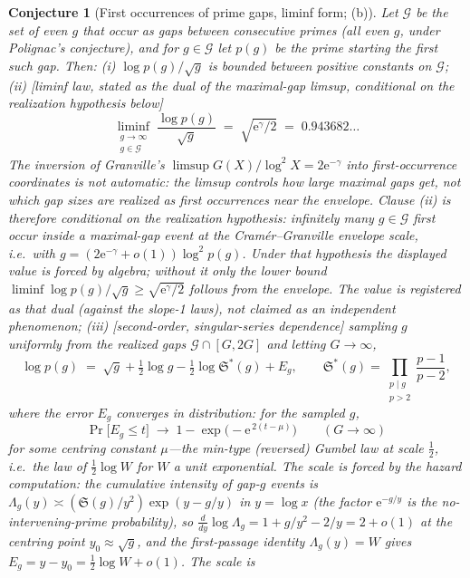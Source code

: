 \documentclass[11pt]{article}
\newtheorem{conjecture}{Conjecture}
\theoremstyle{definition}
\newcommand{\e}{\mathrm{e}}
\newcommand{\SG}{\mathfrak S}
\begin{document}
\setcounter{conjecture}{10}%
\begin{conjecture}[First occurrences of prime gaps, liminf form;
(b)]\label{c19}
Let $\mathcal G$ be the set of even $g$ that occur as gaps between
consecutive primes (all even $g$, under Polignac's conjecture), and for
$g\in\mathcal G$ let $p(g)$ be the prime starting the first such gap.
Then:
\emph{(i)} $\log p(g)/\sqrt g$ is bounded between positive constants
on $\mathcal G$;
\emph{(ii)} [liminf law, stated as the dual of the maximal-gap
limsup, \emph{conditional on the realization hypothesis below}]
\[
\liminf_{\substack{g\to\infty\\ g\in\mathcal G}}
\ \frac{\log p(g)}{\sqrt g}
\;=\;\sqrt{\e^{\gamma}/2}\;=\;0.943682\ldots
\]
The inversion of Granville's $\limsup G(X)/\log^2X=2\e^{-\gamma}$
into first-occurrence coordinates is \emph{not} automatic: the limsup
controls how large maximal gaps get,
not which gap \emph{sizes} are realized as first occurrences near the
envelope.  Clause (ii) is therefore conditional on the
\emph{realization hypothesis}: infinitely many $g\in\mathcal G$ first
occur inside a maximal-gap event at the Cram\'er--Granville envelope
scale, i.e.\ with $g=(2\e^{-\gamma}+o(1))\log^2 p(g)$.  Under that
hypothesis the displayed value is forced by algebra; without it only
the lower bound
$\liminf\log p(g)/\sqrt g\ge\sqrt{\e^{\gamma}/2}$ follows from the
envelope.  The value is registered \emph{as} that dual (against the
slope-1 laws), not claimed as an independent phenomenon;
\emph{(iii)} [second-order, singular-series dependence] sampling $g$
uniformly from the realized gaps $\mathcal G\cap[G,2G]$ and letting
$G\to\infty$,
\[
\log p(g)\;=\;\sqrt g+\tfrac12\log g-\tfrac12\log\SG^{*}(g)+E_g,
\qquad
\SG^{*}(g)=\prod_{\substack{p\mid g\\ p>2}}\frac{p-1}{p-2},
\]
where the error $E_g$ converges in distribution: for the sampled $g$,
\[
\Pr\bigl[E_g\le t\bigr]\;\longrightarrow\;
1-\exp\bigl(-\e^{\,2(t-\mu)}\bigr)
\qquad(G\to\infty)
\]
for some centring constant $\mu$---the min-type (reversed) Gumbel
law \emph{at scale} $\tfrac12$, i.e.\ the law of $\tfrac12\log W$
for $W$ a unit exponential.  The scale is forced by the hazard computation:
the cumulative intensity of
gap-$g$ events is $\Lambda_g(y)\asymp(\SG(g)/y^2)\exp(y-g/y)$ in
$y=\log x$ (the factor $\e^{-g/y}$ \emph{is} the no-intervening-prime
probability), so
$\frac{d}{dy}\log\Lambda_g=1+g/y^2-2/y=2+o(1)$ at the centring
point $y_0\approx\sqrt g$, and the first-passage identity
$\Lambda_g(y)=W$ gives $E_g=y-y_0=\tfrac12\log W+o(1)$.  The scale is

\end{conjecture}
\end{document}
